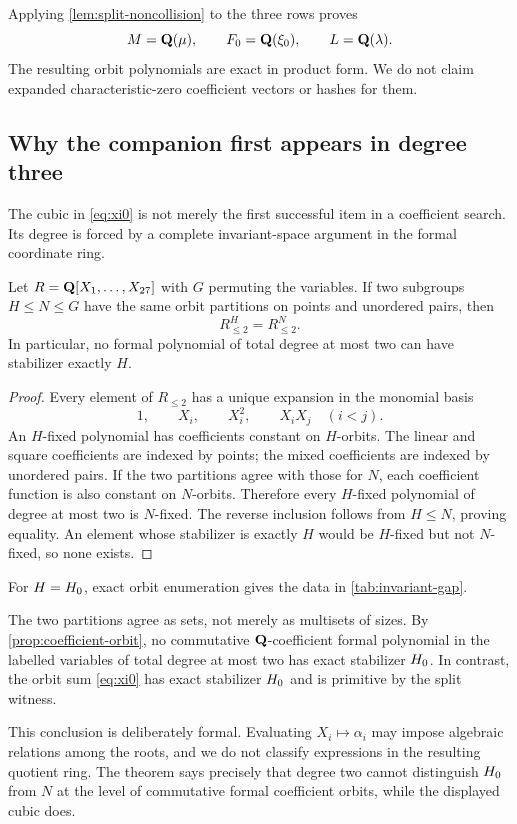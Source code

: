 Applying \cref{lem:split-noncollision} to the three rows proves
\begin{equation}
 M=\mathbf{Q}(\mu),\qquad F_{0}=\mathbf{Q}(\xi_0),\qquad L=\mathbf{Q}(\lambda).
 \label{eq:primitive-identities}
\end{equation}
The resulting orbit polynomials are exact in product form.  We do not claim
expanded characteristic-zero coefficient vectors or hashes for them.

\subsection{Why the companion first appears in degree three}

The cubic in \eqref{eq:xi0} is not merely the first successful item in a
coefficient search.  Its degree is forced by a complete invariant-space
argument in the formal coordinate ring.

\begin{proposition}
\label{prop:coefficient-orbit}
Let $R=\mathbf{Q}[X_1,\ldots,X_{27}]$ with $G$ permuting the variables.  If two
subgroups $H\le N\le G$ have the same orbit partitions on points and
unordered pairs, then
\[
 R_{\le2}^{H}=R_{\le2}^{N}.
\]
In particular, no formal polynomial of total degree at most two can have
stabilizer exactly $H$.
\end{proposition}

\begin{proof}
Every element of $R_{\le2}$ has a unique expansion in the monomial basis
\[
 1,\qquad X_i,\qquad X_i^2,\qquad X_iX_j\quad(i<j).
\]
An $H$-fixed polynomial has coefficients constant on $H$-orbits.  The linear
and square coefficients are indexed by points; the mixed coefficients are
indexed by unordered pairs.  If the two partitions agree with those for
$N$, each coefficient function is also constant on $N$-orbits.  Therefore
every $H$-fixed polynomial of degree at most two is $N$-fixed.  The reverse
inclusion follows from $H\le N$, proving equality.  An element whose
stabilizer is exactly $H$ would be $H$-fixed but not $N$-fixed, so none
exists.
\end{proof}

For $H=H_{0}$, exact orbit enumeration gives the data in
\cref{tab:invariant-gap}.

The two partitions agree as sets, not merely as multisets of sizes.  By
\cref{prop:coefficient-orbit}, no commutative $\mathbf{Q}$-coefficient formal
polynomial in the labelled variables of total degree at most two has exact
stabilizer $H_{0}$.  In contrast, the orbit sum \eqref{eq:xi0} has exact
stabilizer $H_{0}$ and is primitive by the split witness.

This conclusion is deliberately formal.  Evaluating $X_i\mapsto\alpha_i$
may impose algebraic relations among the roots, and we do not classify
expressions in the resulting quotient ring.  The theorem says precisely that
degree two cannot distinguish $H_{0}$ from $N$ at the level of commutative
formal coefficient orbits, while the displayed cubic does.
